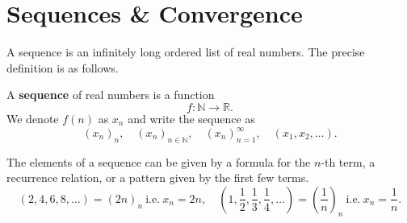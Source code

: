 \documentclass[../real_analysis.tex]{subfiles}
\begin{document}
    \section{Sequences \& Convergence}\label{sec:sequences-and-convergence}
        A sequence is an infinitely long ordered list of real numbers. The precise definition is as follows.
        \begin{definition}
            A \textbf{sequence} of real numbers is a function
            \[f:\mathbb{N}\to\mathbb{R}.\]
            We denote $f(n)$ as $x_n$ and write the sequence as
            \[(x_n)_n,\quad(x_n)_{n\in\mathbb{N}},\quad(x_n)_{n=1}^\infty,\quad(x_1,x_2,\dots).\]
        \end{definition}
        The elements of a sequence can be given by a formula for the $n$-th term, a recurrence relation, or a pattern given by the first few terms.
        \begin{equation}
            (2,4,6,8,\dots)=(2n)_n\ \mathrm{i.e.}\ x_n=2n,\quad\left(1,\frac{1}{2},\frac{1}{3},\frac{1}{4},\dots\right)=\left(\frac{1}{n}\right)_n\ \mathrm{i.e.}\ x_n=\frac{1}{n}.
        \end{equation}
\end{document}
